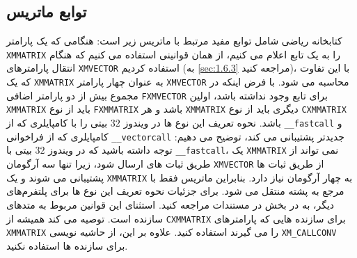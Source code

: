 \subsection{\textbf{توابع ماتریس}}
{
    \Large
    \begin{spacing}{1.5}
        کتابخانه ریاضی  شامل توابع مفید مرتبط با ماتریس زیر است:
        \textbf{\vspace{6pt}}
        \lr{}
        \textbf{\vspace{6pt}}
        هنگامی که یک پارامتر \texttt{XMMATRIX} را به یک تابع اعلام می کنیم، از همان قوانینی استفاده می کنیم که هنگام انتقال پارامترهای \texttt{XMVECTOR} استفاده کردیم
        (به \ref{sec:1.6.3} مراجعه کنید)،
        با این تفاوت که یک \texttt{XMMATRIX} به عنوان چهار پارامتر \texttt{XMVECTOR} محاسبه می شود.
        با فرض اینکه در مجموع بیش از دو پارامتر اضافی \texttt{FXMVECTOR} برای تابع وجود نداشته باشد،
        اولین \texttt{XMMATRIX} باید از نوع \texttt{FXMMATRIX} باشد و هر \texttt{XMMATRIX} دیگری باید از نوع \texttt{CXMMATRIX} باشد.
        نحوه تعریف این نوع ها در ویندوز $32$ بیتی را با کامپایلری که از \texttt{\_\_fastcall}
        و کامپایلری که از فراخوانی \texttt{\_\_vectorcall} جدیدتر پشتیبانی می کند، توضیح می دهیم:
        \textbf{\vspace{3pt}}
        \lr{}
        \textbf{\vspace{6pt}}
        توجه داشته باشید که در ویندوز $32$ بیتی با \texttt{\_\_fastcall}، یک \texttt{XMMATRIX} نمی تواند از طریق ثبات های  ارسال شود،
        زیرا تنها سه آرگومان \texttt{XMVECTOR} از طریق ثبات ها پشتیبانی می شوند و یک \texttt{XMMATRIX} به چهار آرگومان نیاز دارد.
        بنابراین ماتریس فقط با مرجع به پشته منتقل می شود.
        برای جزئیات نحوه تعریف این نوع ها برای پلتفرم‌های دیگر، به  در بخش  در مستندات  مراجعه کنید.
        استثنای این قوانین مربوط به متدهای سازنده است.
         توصیه می کند همیشه از \texttt{CXMMATRIX} برای سازنده هایی که پارامترهای \texttt{XMMATRIX} را می گیرند استفاده کنید.
        علاوه بر این، از حاشیه نویسی \texttt{XM\_CALLCONV} برای سازنده ها استفاده نکنید.
    \end{spacing}
}

